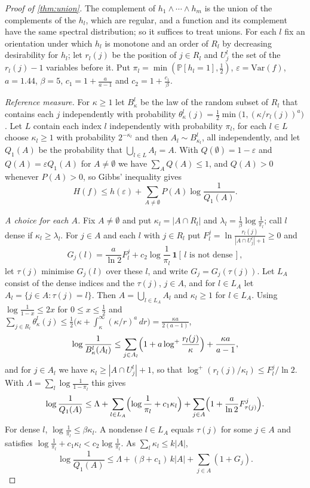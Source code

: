 \documentclass[11pt]{amsart}
\theoremstyle{definition}
\theoremstyle{remark}
\renewcommand{\Pr}{\mathbb{P}}
\newcommand{\Var}{\mathrm{Var}}
\begin{document}
\begin{proof}[Proof of \cref{thm:union}]
The complement of $h_1\wedge\cdots\wedge h_m$ is the union of the complements of the $h_l$, which are regular, and a
function and its complement have the same spectral distribution; so it suffices to treat unions. For each $l$ fix
an orientation under which $h_l$ is monotone and an order of $R_l$ by decreasing desirability for $h_l$; let
$r_l(j)$ be the position of $j\in R_l$ and $U^l_j$ the set of the $r_l(j)-1$ variables before it. Put
$\pi_l=\min(\Pr[h_l=1],\frac12)$, $\varepsilon=\Var(f)$, $a=1.44$, $\beta=5$, $c_1=1+\frac a{a-1}$ and
$c_2=1+\frac{c_1}\beta$.

\emph{Reference measure.} For $\kappa\ge1$ let $B^l_\kappa$ be the law of the random subset of $R_l$ that contains
each $j$ independently with probability $\theta^l_\kappa(j)=\frac12\min\bigl(1,(\kappa/r_l(j))^a\bigr)$. Let $L$
contain each index $l$ independently with probability $\pi_l$, for each $l\in L$ choose $\kappa_l\ge1$ with
probability $2^{-\kappa_l}$ and then $A_l\sim B^l_{\kappa_l}$, all independently, and let $Q_1(A)$ be the
probability that $\bigcup_{l\in L}A_l=A$. With $Q(\emptyset)=1-\varepsilon$ and $Q(A)=\varepsilon Q_1(A)$ for
$A\ne\emptyset$ we have $\sum_AQ(A)\le1$, and $Q(A)>0$ whenever $P(A)>0$, so Gibbs' inequality gives
\[
H(f)\le h(\varepsilon)+\sum_{A\ne\emptyset}P(A)\log\frac1{Q_1(A)}.
\]

\emph{A choice for each $A$.} Fix $A\ne\emptyset$ and put $\kappa_l=|A\cap R_l|$ and
$\lambda_l=\frac1\beta\log\frac1{\pi_l}$; call $l$ dense if $\kappa_l\ge\lambda_l$. For $j\in A$ and each $l$ with
$j\in R_l$ put $F^j_l=\ln\frac{r_l(j)}{|A\cap U^l_j|+1}\ge0$ and
\[
G_j(l)=\frac a{\ln2}F^j_l+c_2\log\frac1{\pi_l}\,\mathbf 1[\,l\text{ is not dense}\,],
\]
let $\tau(j)$ minimise $G_j(l)$ over these $l$, and write $G_j=G_j(\tau(j))$. Let $L_A$ consist of the dense indices
and the $\tau(j)$, $j\in A$, and for $l\in L_A$ let $A_l=\{j\in A:\tau(j)=l\}$. Then $A=\bigcup_{l\in L_A}A_l$ and
$\kappa_l\ge1$ for $l\in L_A$. Using $\log\frac1{1-x}\le2x$ for $0\le x\le\frac12$ and
$\sum_{j\in R_l}\theta^l_\kappa(j)\le\frac12\bigl(\kappa+\int_\kappa^\infty(\kappa/r)^a\,dr\bigr)=\frac{\kappa a}{2(a-1)}$,
\[
\log\frac1{B^l_\kappa(A_l)}\le\sum_{j\in A_l}\Bigl(1+a\log^+\frac{r_l(j)}\kappa\Bigr)+\frac{\kappa a}{a-1},
\]
and for $j\in A_l$ we have $\kappa_l\ge|A\cap U^l_j|+1$, so that $\log^+(r_l(j)/\kappa_l)\le F^j_l/\ln2$. With
$\Lambda=\sum_l\log\frac1{1-\pi_l}$ this gives
\[
\log\frac1{Q_1(A)}\le\Lambda+\sum_{l\in L_A}\Bigl(\log\frac1{\pi_l}+c_1\kappa_l\Bigr)
+\sum_{j\in A}\Bigl(1+\frac a{\ln2}F^j_{\tau(j)}\Bigr).
\]
For dense $l$, $\log\frac1{\pi_l}\le\beta\kappa_l$. A nondense $l\in L_A$ equals $\tau(j)$ for some $j\in A$ and
satisfies $\log\frac1{\pi_l}+c_1\kappa_l<c_2\log\frac1{\pi_l}$. As $\sum_l\kappa_l\le k|A|$,
\[
\log\frac1{Q_1(A)}\le\Lambda+(\beta+c_1)\,k|A|+\sum_{j\in A}(1+G_j).
\]


\end{proof}
\end{document}
